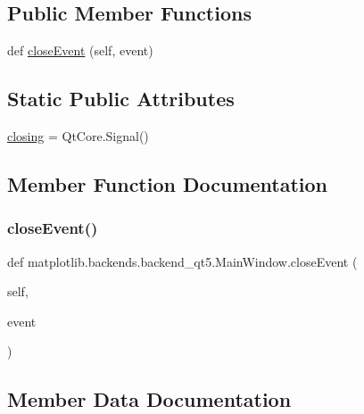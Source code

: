 \subsection*{Public Member Functions}
\begin{DoxyCompactItemize}
\item 
def \hyperlink{classmatplotlib_1_1backends_1_1backend__qt5_1_1MainWindow_aa6b3ab1c2ece776a4001d297cff81da0}{close\+Event} (self, event)
\end{DoxyCompactItemize}
\subsection*{Static Public Attributes}
\begin{DoxyCompactItemize}
\item 
\hyperlink{classmatplotlib_1_1backends_1_1backend__qt5_1_1MainWindow_a7a113d42bf98fd669bf30ffac20973fe}{closing} = Qt\+Core.\+Signal()
\end{DoxyCompactItemize}


\subsection{Member Function Documentation}
\mbox{\label{classmatplotlib_1_1backends_1_1backend__qt5_1_1MainWindow_aa6b3ab1c2ece776a4001d297cff81da0}} 
\subsubsection{\texorpdfstring{close\+Event()}{closeEvent()}}
{\footnotesize\ttfamily def matplotlib.\+backends.\+backend\+\_\+qt5.\+Main\+Window.\+close\+Event (\begin{DoxyParamCaption}\item[{}]{self,  }\item[{}]{event }\end{DoxyParamCaption})}



\subsection{Member Data Documentation}
\mbox{\label{classmatplotlib_1_1backends_1_1backend__qt5_1_1MainWindow_a7a113d42bf98fd669bf30ffac20973fe}} 
